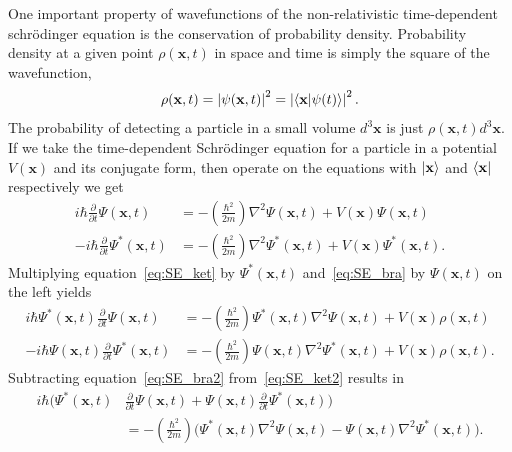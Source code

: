 \documentclass[titlepage,letterpaper,onecolumn,11pt,final]{report}
\numberwithin{equation}{section}
\numberwithin{figure}{section}
\begin{document}
One important property of wavefunctions of the non-relativistic time-dependent schr\"{o}dinger equation is the conservation of probability density. Probability density at a given point $\rho (\mathbf{x},t)$ in space and time is simply the square of the wavefunction,
\begin{gather}
	\rho (\mathbf{x}, t) = \left| \psi(\mathbf{x},t) \right|^{2} = \left| \braket{\mathbf{x} | \psi (t) } \right|^{2} .
\end{gather}
%
The probability of detecting a particle in a small volume $d^{3} \mathbf{x}$ is just $\rho (\mathbf{x},t) d^{3} \mathbf{x}$. If we take the time-dependent Schr\"{o}dinger equation for a particle in a potential $V(\mathbf{x})$ and its conjugate form, then operate on the equations with $\ket{\mathbf{x}}$ and $\bra{\mathbf{x}}$ respectively we get
\begin{subequations}
\begin{align}
	\label{eq:SE_ket}
	i \hbar \frac{\partial}{\partial t} \Psi (\mathbf{x},t) &= - \left( \frac{\hbar^{2}}{2m} \right) \nabla^{2} \Psi (\mathbf{x},t) + V (\mathbf{x}) \Psi (\mathbf{x},t)  \\
	\label{eq:SE_bra}
	- i \hbar \frac{\partial}{\partial t} \Psi^{*} (\mathbf{x},t) &= - \left( \frac{\hbar^{2}}{2m} \right) \nabla^{2} \Psi^{*} (\mathbf{x},t) + V (\mathbf{x}) \Psi^{*} (\mathbf{x},t) .
\end{align}
\end{subequations}
%
Multiplying equation~\ref{eq:SE_ket} by $\Psi^{*}(\mathbf{x},t)$ and~\ref{eq:SE_bra} by $\Psi(\mathbf{x},t)$ on the left yields
\begin{subequations}
\begin{align}
	\label{eq:SE_ket2}
	i \hbar \Psi^{*} (\mathbf{x},t) \frac{\partial}{\partial t} \Psi (\mathbf{x},t) &= - \left( \frac{\hbar^{2}}{2m} \right) \Psi^{*} (\mathbf{x},t) \nabla^{2} \Psi (\mathbf{x},t) + V (\mathbf{x}) \rho (\mathbf{x},t) \\
	\label{eq:SE_bra2}
	- i \hbar \Psi (\mathbf{x},t) \frac{\partial}{\partial t} \Psi^{*} (\mathbf{x},t) &= - \left( \frac{\hbar^{2}}{2m} \right) \Psi(\mathbf{x},t) \nabla^{2} \Psi^{*} (\mathbf{x},t) + V (\mathbf{x}) \rho (\mathbf{x},t) .
\end{align}
\end{subequations}
%
Subtracting equation~\ref{eq:SE_bra2} from~\ref{eq:SE_ket2} results in
\begin{equation}
	\begin{split}
	\label{eq:SE_diff}
	i \hbar \bigg( \Psi^{*} (\mathbf{x},t) & \frac{\partial}{\partial t} \Psi (\mathbf{x},t) + \Psi (\mathbf{x},t) \frac{\partial}{\partial t} \Psi^{*} (\mathbf{x},t) \bigg) \\
	& = - \left( \frac{\hbar^{2}}{2m} \right) \bigg( \Psi^{*} (\mathbf{x},t) \nabla^{2} \Psi (\mathbf{x},t) - \Psi(\mathbf{x},t) \nabla^{2} \Psi^{*} (\mathbf{x},t) \bigg) .
	\end{split}
\end{equation}
\end{document}
